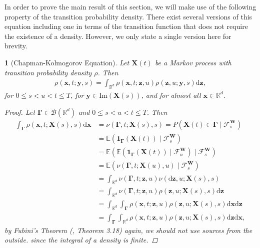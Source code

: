 \documentclass[english]{article}
\newcommand{\comment}[1]{\color{blue}#1\color{black}}
\numberwithin{equation}{section}
\numberwithin{figure}{section}
\theoremstyle{bolddescit}
\newtheorem{theorem}{\protect\theoremname}[section]
\theoremstyle{definition}
\theoremstyle{definition}
\theoremstyle{plain}
\theoremstyle{plain}
\theoremstyle{bolddesc}
\theoremstyle{plain}
\theoremstyle{remark}
\providecommand{\theoremname}{Theorem}
\begin{document}
In order to prove the main result of this section, we will make use of the following property of the transition probability density. There exist several versions of this equation including one in terms of the transition function that does not require the existence of a density. However, we only state a single version here for brevity.

\begin{theorem}[Chapman-Kolmogorov Equation]\label{thm:fp-chapman-kolmogorov}
  Let $\mathbf{X}(t)$ be a Markov process with transition probability density $\rho$. Then
  \begin{align*}
    \rho(\mathbf{x}, t; \mathbf{y}, s) = \int_{\mathbb{R}^d} \rho(\mathbf{x}, t; \mathbf{z}, u) \rho(\mathbf{z}, u; \mathbf{y}, s) \mathrm{d}\mathbf{z},
  \end{align*}
  for $0 \le s < u < t \le T$, for $\mathbf{y} \in \mathrm{Im}(\mathbf{X}(s))$, and for almost all $\mathbf{x} \in \mathbb{R}^d$.

  \begin{proof}
    Let $\mathbf{\Gamma} \in \mathcal{B}(\mathbb{R}^d)$ and $0 \le s < u < t \le T$. Then
    \begin{align*}
      \int_\mathbf{\Gamma} \rho(\mathbf{x},t;\mathbf{X}(s),s) \mathrm{d}\mathbf{x}
      &= \nu(\mathbf{\Gamma},t;\mathbf{X}(s),s)
      = P(\mathbf{X}(t) \in \mathbf{\Gamma} \mid \mathcal{F}^\mathbf{W}_s)\\
      &= \mathbb{E}(\mathbf{1}_\mathbf{\Gamma}(\mathbf{X}(t)) \mid \mathcal{F}^\mathbf{W}_s)\\
      &= \mathbb{E}(\mathbb{E}(\mathbf{1}_\mathbf{\Gamma}(\mathbf{X}(t)) \mid \mathcal{F}^\mathbf{W}_u) \mid \mathcal{F}^\mathbf{W}_s) \tag{tower property}\\
      &= \mathbb{E}(\nu(\mathbf{\Gamma},t;\mathbf{X}(u),u) \mid \mathcal{F}^\mathbf{W}_s)\\
      &= \int_{\mathbb{R}^d} \nu(\mathbf{\Gamma},t;\mathbf{z},u) \nu(\mathrm{d}\mathbf{z},u;\mathbf{X}(s),s)\\
      &= \int_{\mathbb{R}^d} \nu(\mathbf{\Gamma},t;\mathbf{z},u) \rho(\mathbf{z},u;\mathbf{X}(s),s) \mathrm{d}\mathbf{z}\\
      &= \int_{\mathbb{R}^d} \int_\mathbf{\Gamma} \rho(\mathbf{x},t;\mathbf{z},u) \rho(\mathbf{z},u;\mathbf{X}(s),s) \mathrm{d}\mathbf{x} \mathrm{d}\mathbf{z}\\
      &= \int_\mathbf{\Gamma} \int_{\mathbb{R}^d} \rho(\mathbf{x},t;\mathbf{z},u) \rho(\mathbf{z},u;\mathbf{X}(s),s) \mathrm{d}\mathbf{z} \mathrm{d}\mathbf{x},
    \end{align*}
    by Fubini's Theorem (\cite{kopp_probability_2013}, Theorem 3.18)
\comment{again, we should not use sources from the outside.}
     since the integral of a density is finite.


\end{proof}
\end{theorem}
\end{document}
